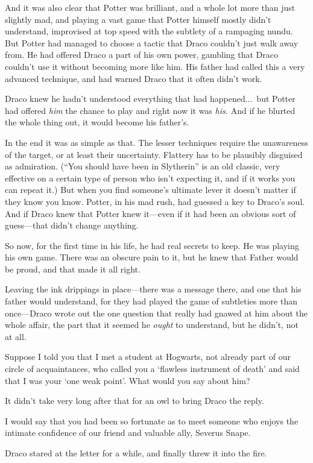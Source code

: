 And it was also clear that Potter was brilliant, and a whole lot more than just slightly mad, and playing a vast game that Potter himself mostly didn’t understand, improvised at top speed with the subtlety of a rampaging nundu. But Potter had managed to choose a tactic that Draco couldn’t just walk away from. He had offered Draco a part of his own power, gambling that Draco couldn’t use it without becoming more like him. His father had called this a very advanced technique, and had warned Draco that it often didn’t work.

Draco knew he hadn’t understood everything that had happened...\ but Potter had offered \emph{him} the chance to play and right now it was \emph{his.} And if he blurted the whole thing out, it would become his father’s.

In the end it was as simple as that. The lesser techniques require the unawareness of the target, or at least their uncertainty. Flattery has to be plausibly disguised as admiration. (“You should have been in Slytherin” is an old classic, very effective on a certain type of person who isn’t expecting it, and if it works you can repeat it.) But when you find someone’s ultimate lever it doesn’t matter if they know you know. Potter, in his mad rush, had guessed a key to Draco’s soul. And if Draco knew that Potter knew it—even if it had been an obvious sort of guess—that didn’t change anything.

So now, for the first time in his life, he had real secrets to keep. He was playing his own game. There was an obscure pain to it, but he knew that Father would be proud, and that made it all right.

Leaving the ink drippings in place—there was a message there, and one that his father would understand, for they had played the game of subtleties more than once—Draco wrote out the one question that really had gnawed at him about the whole affair, the part that it seemed he \emph{ought} to understand, but he didn’t, not at all.

\begin{writtenNote}
Suppose I told you that I met a student at Hogwarts, not already part of our circle of acquaintances, who called you a ‘flawless instrument of death’ and said that I was your ‘one weak point’. What would you say about him?
\end{writtenNote}

It didn’t take very long after that for an owl to bring Draco the reply.

\begin{writtenNote}
I would say that you had been so fortunate as to meet someone who enjoys the intimate confidence of our friend and valuable ally, Severus Snape.
\end{writtenNote}

Draco stared at the letter for a while, and finally threw it into the fire.


